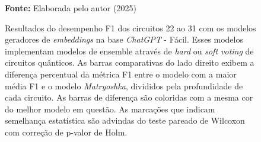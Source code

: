 \begin{figure}
\caption{Resultados do desempenho F1 dos circuitos 22 ao 31 com os modelos geradores de \textit{embeddings} na base \textit{ChatGPT} - Fácil. Esses modelos implementam modelos de ensemble através de \textit{hard} ou \textit{soft voting} de circuitos quânticos. As barras comparativas do lado direito exibem a diferença percentual da métrica F1 entre o modelo com a maior média F1 e o modelo \textit{Matryoshka}, divididos pela profundidade de cada circuito. As barras de diferença são coloridas com a mesma cor do melhor modelo em questão. As marcações que indicam semelhança estatística são advindas do teste pareado de Wilcoxon com correção de p-valor de Holm.}
\label{fig:model_transformer:easy:g7}
     \centering
    \centering

      \par\medskip\ABNTEXfontereduzida\selectfont\textbf{Fonte:} Elaborada pelo autor (2025) \par\medskip
\end{figure}